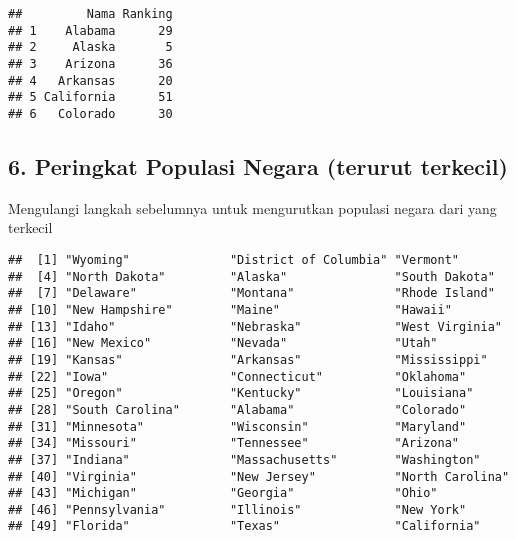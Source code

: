 \documentclass[
]{article}
\newenvironment{Shaded}{\begin{snugshade}}{\end{snugshade}}
\newcommand{\DataTypeTok}[1]{\textcolor[rgb]{0.13,0.29,0.53}{#1}}
\newcommand{\KeywordTok}[1]{\textcolor[rgb]{0.13,0.29,0.53}{\textbf{#1}}}
\newcommand{\NormalTok}[1]{#1}
\newcommand{\OperatorTok}[1]{\textcolor[rgb]{0.81,0.36,0.00}{\textbf{#1}}}
\newcommand{\StringTok}[1]{\textcolor[rgb]{0.31,0.60,0.02}{#1}}
\begin{document}
\begin{verbatim}
##         Nama Ranking
## 1    Alabama      29
## 2     Alaska       5
## 3    Arizona      36
## 4   Arkansas      20
## 5 California      51
## 6   Colorado      30
\end{verbatim}

\hypertarget{peringkat-populasi-negara-terurut-terkecil}{%
\subsection{6. Peringkat Populasi Negara (terurut
terkecil)}\label{peringkat-populasi-negara-terurut-terkecil}}

Mengulangi langkah sebelumnya untuk mengurutkan populasi negara dari
yang terkecil

\begin{Shaded}
\end{Shaded}

\begin{verbatim}
##  [1] "Wyoming"              "District of Columbia" "Vermont"             
##  [4] "North Dakota"         "Alaska"               "South Dakota"        
##  [7] "Delaware"             "Montana"              "Rhode Island"        
## [10] "New Hampshire"        "Maine"                "Hawaii"              
## [13] "Idaho"                "Nebraska"             "West Virginia"       
## [16] "New Mexico"           "Nevada"               "Utah"                
## [19] "Kansas"               "Arkansas"             "Mississippi"         
## [22] "Iowa"                 "Connecticut"          "Oklahoma"            
## [25] "Oregon"               "Kentucky"             "Louisiana"           
## [28] "South Carolina"       "Alabama"              "Colorado"            
## [31] "Minnesota"            "Wisconsin"            "Maryland"            
## [34] "Missouri"             "Tennessee"            "Arizona"             
## [37] "Indiana"              "Massachusetts"        "Washington"          
## [40] "Virginia"             "New Jersey"           "North Carolina"      
## [43] "Michigan"             "Georgia"              "Ohio"                
## [46] "Pennsylvania"         "Illinois"             "New York"            
## [49] "Florida"              "Texas"                "California"
\end{verbatim}
\end{document}
